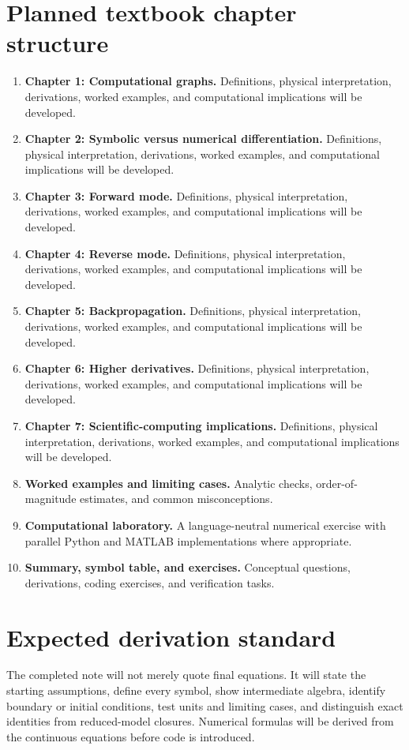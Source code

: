 \documentclass[11pt]{article}
\begin{document}
\section{Planned textbook chapter structure}
\begin{enumerate}[leftmargin=1.8em]
\item \textbf{Chapter 1: Computational graphs.} Definitions, physical interpretation, derivations, worked examples, and computational implications will be developed.
\item \textbf{Chapter 2: Symbolic versus numerical differentiation.} Definitions, physical interpretation, derivations, worked examples, and computational implications will be developed.
\item \textbf{Chapter 3: Forward mode.} Definitions, physical interpretation, derivations, worked examples, and computational implications will be developed.
\item \textbf{Chapter 4: Reverse mode.} Definitions, physical interpretation, derivations, worked examples, and computational implications will be developed.
\item \textbf{Chapter 5: Backpropagation.} Definitions, physical interpretation, derivations, worked examples, and computational implications will be developed.
\item \textbf{Chapter 6: Higher derivatives.} Definitions, physical interpretation, derivations, worked examples, and computational implications will be developed.
\item \textbf{Chapter 7: Scientific-computing implications.} Definitions, physical interpretation, derivations, worked examples, and computational implications will be developed.
\item \textbf{Worked examples and limiting cases.} Analytic checks, order-of-magnitude estimates, and common misconceptions.
\item \textbf{Computational laboratory.} A language-neutral numerical exercise with parallel Python and MATLAB implementations where appropriate.
\item \textbf{Summary, symbol table, and exercises.} Conceptual questions, derivations, coding exercises, and verification tasks.
\end{enumerate}

\section{Expected derivation standard}
The completed note will not merely quote final equations. It will state the starting assumptions, define every symbol, show intermediate algebra, identify boundary or initial conditions, test units and limiting cases, and distinguish exact identities from reduced-model closures. Numerical formulas will be derived from the continuous equations before code is introduced.
\end{document}
